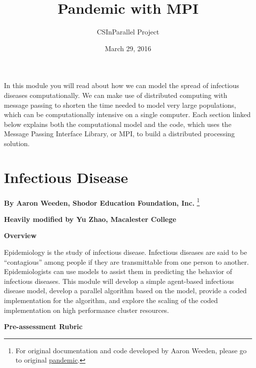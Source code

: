 \documentclass[letterpaper,10pt,openany,oneside]{sphinxmanual}
\title{Pandemic with MPI}
\date{March 29, 2016}
\author{CSInParallel Project}
\begin{document}
\maketitle
\tableofcontents
{}\label{index::doc}


In this module you will read about how we can model the spread of infectious diseases computationally.
We can make use of distributed computing with message passing to shorten the time needed to model very large populations,
which can be computationally intensive on a single computer.
Each section linked below explains both the computational model and the code, which uses the
Message Passing Interface Library, or MPI, to build a distributed processing solution.


\chapter{Infectious Disease}
\label{0-Introduction/introduction:pandemic-with-mpi}\label{0-Introduction/introduction:infectious-disease}\label{0-Introduction/introduction::doc}
\textbf{By Aaron Weeden, Shodor Education Foundation, Inc.} \footnote{
For original documentation and code developed by Aaron Weeden, please go to original \href{http://www.shodor.org/petascale/materials/UPModules/infectiousDisease/}{pandemic}.
}

\textbf{Heavily modified by Yu Zhao, Macalester College}

\textbf{Overview}

Epidemiology is the study of infectious disease. Infectious diseases are
said to be “contagious” among people if they are transmittable from one
person to another. Epidemiologists can use models to assist them in
predicting the behavior of infectious diseases. This module will develop
a simple agent-based infectious disease model, develop a parallel
algorithm based on the model, provide a coded implementation for the
algorithm, and explore the scaling of the coded implementation on high
performance cluster resources.

\textbf{Pre-assessment Rubric}
\end{document}
